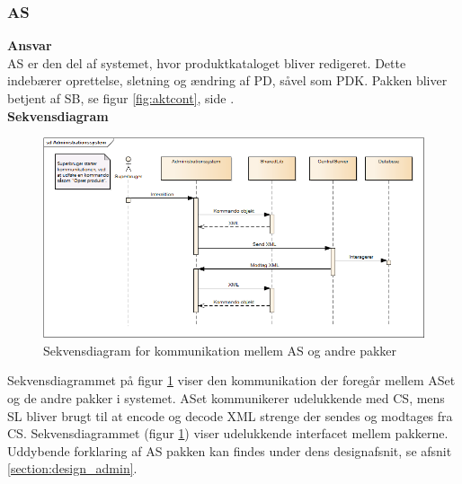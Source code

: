 \subsubsection{\gls{AS}}
\textbf{Ansvar}\\
\gls{AS} er den del af systemet, hvor produktkataloget bliver redigeret. Dette indebærer oprettelse, sletning og ændring af \gls{PD}, såvel som \gls{PDK}. Pakken bliver betjent af \gls{SB}, se figur \ref{fig:aktcont}, side \pageref{fig:aktcont}.\\

\textbf{Sekvensdiagram}
\begin{figure}[H]
	\centering
	\includegraphics[scale=0.5]{Systemarkitektur/LogiskView/Administrationssystem-sekvensdiagram}
	\caption{Sekvensdiagram for kommunikation mellem \gls{AS} og andre pakker}
	\label{fig:logview_admin_sekvensdiagram}
\end{figure}

Sekvensdiagrammet på figur \ref{fig:logview_admin_sekvensdiagram} viser den kommunikation der foregår mellem \gls{AS}et og de andre pakker i systemet. \gls{AS}et kommunikerer udelukkende med \gls{CS}, mens \gls{SL} bliver brugt til at encode og decode XML strenge der sendes og modtages fra \gls{CS}. Sekvensdiagrammet (figur \ref{fig:logview_admin_sekvensdiagram}) viser udelukkende interfacet mellem pakkerne. Uddybende forklaring af \gls{AS} pakken kan findes under dens designafsnit, se afsnit \ref{section:design_admin}.

